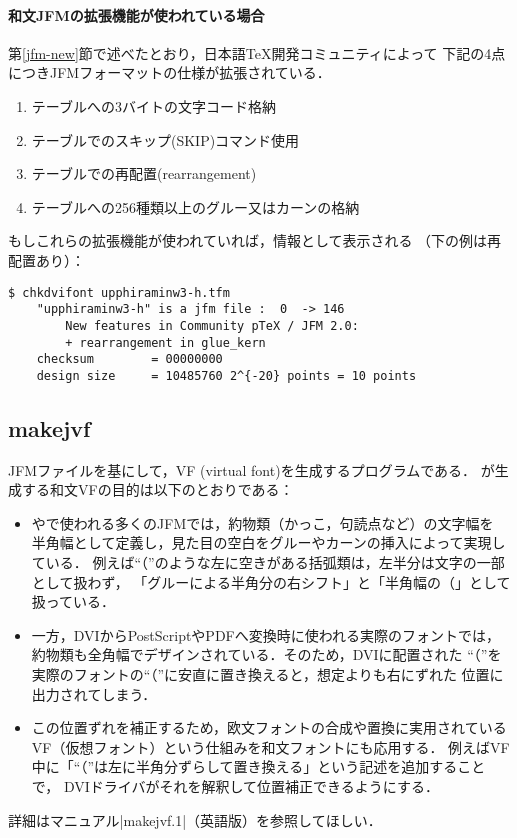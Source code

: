 \documentclass[a4paper,11pt,nomag]{jsarticle}
\begin{document}
\paragraph{和文JFMの拡張機能が使われている場合}
第\ref{jfm-new}節で述べたとおり，日本語\TeX 開発コミュニティによって
下記の4点につきJFMフォーマットの仕様が拡張されている．
\begin{enumerate}
  \item {}テーブルへの3バイトの文字コード格納
  \item {}テーブルでのスキップ(SKIP)コマンド使用
  \item {}テーブルでの再配置(rearrangement)
  \item {}テーブルへの256種類以上のグルー又はカーンの格納
\end{enumerate}
もしこれらの拡張機能が使われていれば，情報として表示される
（下の例は再配置あり）：
\begin{verbatim}
$ chkdvifont upphiraminw3-h.tfm
    "upphiraminw3-h" is a jfm file :  0  -> 146
        New features in Community pTeX / JFM 2.0:
        + rearrangement in glue_kern
    checksum        = 00000000
    design size     = 10485760 2^{-20} points = 10 points
\end{verbatim}

\subsection{makejvf}\label{makejvf}

JFMファイルを基にして，VF (virtual font)を生成するプログラムである．
が生成する和文VFの目的は以下のとおりである：
\begin{itemize}
  \item \pTeX や\upTeX で使われる多くのJFMでは，約物類（かっこ，句読点など）の文字幅を
    半角幅として定義し，見た目の空白をグルーやカーンの挿入によって実現している．
    例えば``（''のような左に空きがある括弧類は，左半分は文字の一部として扱わず，
    「グルーによる半角分の右シフト」と「半角幅の\inhibitglue （」として扱っている．
  \item 一方，DVIからPostScriptやPDFへ変換時に使われる実際のフォントでは，
    約物類も全角幅でデザインされている．そのため，DVIに配置された
    ``（''を実際のフォントの``（''に安直に置き換えると，想定よりも右にずれた
    位置に出力されてしまう．
  \item この位置ずれを補正するため，欧文フォントの合成や置換に実用されている
    VF（仮想フォント）という仕組みを和文フォントにも応用する．
    例えばVF中に「``（''は左に半角分ずらして置き換える」という記述を追加することで，
    DVIドライバがそれを解釈して位置補正できるようにする．
\end{itemize}
詳細はマニュアル|makejvf.1|（英語版）を参照してほしい．
\end{document}
